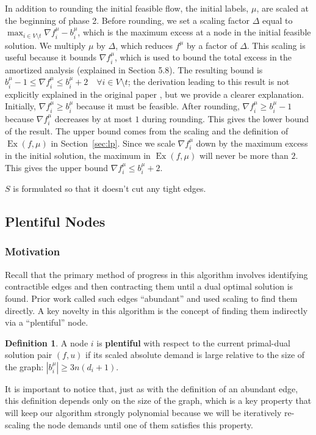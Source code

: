 \documentclass[11pt]{article}
\theoremstyle{definition}
\newtheorem{definition}{Definition}[section]
\theoremstyle{definition}
\newcommand{\fu}{f^{\mu}}
\newcommand{\nfiu}{\nabla \fu_i}
\newcommand{\biu}{b_{i}^{\mu}}
\DeclareMathOperator{\Ex}{Ex}
\begin{document}
    In addition to rounding the initial feasible flow, the initial labels, $\mu$, are scaled at the beginning of phase 2. Before rounding, we set a scaling factor $\Delta$ equal to $\max_{i \in V \setminus t} \nfiu - \biu$, which is the maximum excess at a node in the initial feasible solution. We multiply $\mu$ by $\Delta$, which reduces $f^\mu$ by a factor of $\Delta$. This scaling is useful because it bounds $\nfiu$, which is used to bound the total excess in the amortized analysis (explained in Section 5.8). The resulting bound is $\biu - 1 \leq \nfiu \leq \biu + 2 \quad \forall i \in V \setminus t $; the derivation leading to this result is not explicitly explained in the original paper \cite{Olver2017}, but we provide a clearer explanation. Initially, $\nfiu \geq \biu$ because it must be feasible. After rounding, $\nfiu \geq \biu - 1$ because $\nfiu$ decreases by at most $1$ during rounding. This gives the lower bound of the result. The upper bound comes from the scaling and the definition of $\Ex(f, \mu)$ in Section~\ref{sec:lp}. Since we scale $\nfiu$ down by the maximum excess in the initial solution, the maximum in $\Ex(f,\mu)$ will never be more than $2$. This gives the upper bound $\nfiu \leq \biu + 2$. 

$S$ is formulated so that it doesn't cut any tight edges. 
\subsection{Plentiful Nodes}

\subsubsection{Motivation}

Recall that the primary method of progress in this algorithm involves
identifying contractible edges and then contracting them until a dual optimal
solution is found. Prior work called such edges ``abundant'' and used scaling to
find them directly. A key novelty in this algorithm is the concept of finding
them indirectly via a ``plentiful'' node. 
\begin{definition}
A node $i$ is \textbf{plentiful} with respect
to the current primal-dual solution pair $(f,u)$ if its scaled absolute
demand is large relative to the size of the graph: $|b_i^{\mu}| \ge 3n(d_i + 1)$.
\end{definition}

It is important to notice that, just as with the definition of an abundant  edge,
this definition depends only on the size of the graph, which is a key property
that will keep our algorithm strongly polynomial because we will be iteratively
re-scaling the node demands until one of them satisfies this property.
\end{document}
